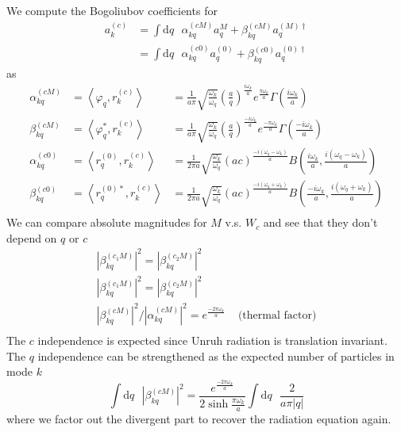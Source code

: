 \documentclass[12pt,a4paper]{article}
\newcommand{\dv}[1]{\mathrm{d} #1 \text{ }}
\begin{document}
We compute the Bogoliubov coefficients for
\begin{equation}
  \begin{array}{ll}
  a^{(c)}_k &= \int \dv{q} \alpha^{(cM)}_{kq} a^{M}_q + \beta^{(cM)}_{kq} a^{(M)\dagger}_q \\
  &= \int \dv{q} \alpha^{(c0)}_{kq} a^{(0)}_q + \beta^{(c0)}_{kq} a^{(0)\dagger}_q
  \end{array}
\end{equation}
as
\begin{equation}
  \begin{array}{ccl}
    \alpha^{(cM)}_{kq} &= \left<\varphi_q, r_k^{(c)} \right> &= \frac{1}{a \pi} \sqrt{\frac{\omega_k}{\omega_q}} \left(\frac{a}{q}\right)^{\frac{i\omega_k}{a}} e^{\frac{\pi \omega_k}{a}} \Gamma\left(\frac{i\omega_k}{a}\right) \\
    \beta^{(cM)}_{kq} &= \left<\varphi_q^*, r_k^{(c)} \right> &= \frac{1}{a \pi} \sqrt{\frac{\omega_k}{\omega_q}} \left(\frac{a}{q}\right)^{\frac{-i\omega_k}{a}} e^{\frac{-\pi \omega_k}{a}} \Gamma\left(\frac{-i\omega_k}{a}\right) \\
    \alpha^{(c0)}_{kq} &= \left<r_q^{(0)}, r_k^{(c)} \right> &= \frac{1}{2 \pi a}\sqrt{\frac{\omega_k}{\omega_q}} (ac)^{\frac{-i(\omega_q - \omega_k)}{a}} B\left(\frac{i\omega_k}{a}, \frac{i(\omega_q - \omega_k)}{a}\right) \\
    \beta^{(c0)}_{kq} &= \left<r_q^{(0)*}, r_k^{(c)} \right> &= \frac{1}{2 \pi a}\sqrt{\frac{\omega_k}{\omega_q}} (ac)^{\frac{-i(\omega_q + \omega_k)}{a}} B\left(\frac{-i\omega_k}{a}, \frac{i(\omega_q + \omega_k)}{a}\right) \\

  \end{array}
\end{equation}
We can compare absolute magnitudes for $M$ v.s. $W_c$ and see that they don't depend on $q$ or $c$
\begin{equation}
  \begin{array}{cc}
    \left|\beta_{kq}^{(c_1M)}\right|^2 = \left|\beta_{kq}^{(c_2M)}\right|^2 & \\
    \left|\beta_{kq}^{(c_1M)}\right|^2 = \left|\beta_{kq}^{(c_2M)}\right|^2 & \\
    \left|\beta_{kq}^{(cM)}\right|^2 / \left|\alpha_{kq}^{(cM)}\right|^2 = e^{\frac{-2\pi\omega_k}{a}}  & \text{   (thermal factor)} \\
 \end{array}
\end{equation}
The $c$ independence is expected since Unruh radiation is translation invariant. The $q$ independence can be strengthened as the expected number of particles in mode $k$
\begin{equation}
 \int \dv{q} \left|\beta_{kq}^{(cM)}\right|^2 = \frac{e^{\frac{-2 \pi \omega_k}{a}}}{2 \sinh \frac{\pi \omega_k}{a}} \int \dv{q} \frac{2}{a\pi |q|}
\end{equation}
where we factor out the divergent part to recover the radiation equation again.
\end{document}
